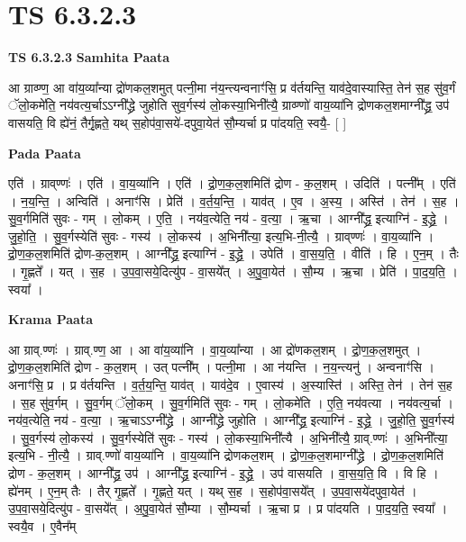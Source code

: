 \documentclass[17pt]{extarticle}
\begin{document}
\section{ TS 6.3.2.3 }

\textbf{TS 6.3.2.3 } \newline
\textbf{Samhita Paata} \newline

आ ग्राव्ण्ण॒ आ वा॑य॒व्या᳚न्या द्रो॑णकल॒शमुत् पत्नी॒मा न॑य॒न्त्यन्वनाꣳ॑सि॒ प्र व॑र्तयन्ति॒ याव॑दे॒वास्यास्ति॒ तेन॑ स॒ह सु॑व॒र्गं ॅलो॒कमे॑ति॒ नय॑वत्य॒र्चाऽऽग्नी᳚द्ध्रे जुहोति सुव॒र्गस्य॑ लो॒कस्या॒भिनी᳚त्यै॒ ग्राव्ण्णो॑ वाय॒व्या॑नि द्रोणकल॒शमाग्नी᳚द्ध्र॒ उप॑ वासयति॒ वि ह्ये॑नं॒ तैर्गृ॒ह्णते॒ यथ् स॒होप॑वा॒सये॑-दपुवा॒येत॑ सौ॒म्यर्चा प्र पा॑दयति॒ स्वयै॒- [  ] \newline

\textbf{Pada Paata} \newline

एति॑ । ग्राव्‌ण्णः॑ । एति॑ । वा॒य॒व्या॑नि । एति॑ । द्रो॒ण॒क॒ल॒शमिति॑ द्रोण - क॒ल॒शम् । उदिति॑ । पत्नी᳚म् । एति॑ । न॒य॒न्ति॒ । अन्विति॑ । अनाꣳ॑सि । प्रेति॑ । व॒र्त॒य॒न्ति॒ । याव॑त् । ए॒व । अ॒स्य॒ । अस्ति॑ । तेन॑ । स॒ह । सु॒व॒र्गमिति॑ सुवः - गम् । लो॒कम् । ए॒ति॒ । नय॑व॒त्येति॒ नय॑ - व॒त्या॒ । ऋ॒चा । आग्नी᳚द्ध्र॒ इत्याग्नि॑ - इ॒द्ध्रे॒ । जु॒हो॒ति॒ । सु॒व॒र्गस्येति॑ सुवः - गस्य॑ । लो॒कस्य॑ । अ॒भिनी᳚त्या॒ इत्य॒भि-नी॒त्यै॒ । ग्राव्‌ण्णः॑ । वा॒य॒व्या॑नि । द्रो॒ण॒क॒ल॒शमिति॑ द्रोण-क॒ल॒शम् । आग्नी᳚द्ध्र॒ इत्याग्नि॑ - इ॒द्ध्रे॒ । उपेति॑ । वा॒स॒य॒ति॒ । वीति॑ । हि । ए॒न॒म् । तैः । गृ॒ह्णते᳚ । यत् । स॒ह । उ॒प॒वा॒सये॒दित्यु॑प - वा॒सये᳚त् । अ॒पु॒वा॒येत॑ । सौ॒म्य । ऋ॒चा । प्रेति॑ । पा॒द॒य॒ति॒ । स्वया᳚ ।  \newline


\textbf{Krama Paata} \newline

आ ग्राव्.ण्णः॑ । ग्राव्.ण्ण॒ आ । आ वा॑य॒व्या॑नि । वा॒य॒व्या᳚न्या । आ द्रो॑णकल॒शम् । द्रो॒ण॒क॒ल॒शमुत् । द्रो॒ण॒क॒ल॒शमिति॑ द्रोण - क॒ल॒शम् । उत् पत्नी᳚म् । पत्नी॒मा । आ न॑यन्ति । न॒य॒न्त्यनु॑ । अन्वनाꣳ॑सि । अनाꣳ॑सि॒ प्र । प्र व॑र्तयन्ति । व॒र्त॒य॒न्ति॒ याव॑त् । याव॑दे॒व । ए॒वास्य॑ । अ॒स्यास्ति॑ । अस्ति॒ तेन॑ । तेन॑ स॒ह । स॒ह सु॑व॒र्गम् । सु॒व॒र्गम् ॅलो॒कम् । सु॒व॒र्गमिति॑ सुवः - गम् । लो॒कमे॑ति । ए॒ति॒ नय॑वत्या । नय॑वत्य॒र्चा । नय॑व॒त्येति॒ नय॑ - व॒त्या॒ । ऋ॒चाऽऽग्नी᳚द्ध्रे । आग्नी᳚द्ध्रे जुहोति । आग्नी᳚द्ध्र॒ इत्याग्नि॑ - इ॒द्ध्रे॒ । जु॒हो॒ति॒ सु॒व॒र्गस्य॑ । सु॒व॒र्गस्य॑ लो॒कस्य॑ । सु॒व॒र्गस्येति॑ सुवः - गस्य॑ । लो॒कस्या॒भिनी᳚त्यै । अ॒भिनी᳚त्यै॒ ग्राव्.ण्णः॑ । अ॒भिनी᳚त्या॒ इत्य॒भि - नी॒त्यै॒ । ग्राव्.ण्णो॑ वाय॒व्या॑नि । वा॒य॒व्या॑नि द्रोणकल॒शम् । द्रो॒ण॒क॒ल॒शमाग्नी᳚द्ध्रे । द्रो॒ण॒क॒ल॒शमिति॑ द्रोण - क॒ल॒शम् । आग्नी᳚द्ध्र॒ उप॑ । आग्नी᳚द्ध्र॒ इत्याग्नि॑ - इ॒द्ध्रे॒ । उप॑ वासयति । वा॒स॒य॒ति॒ वि । वि हि । ह्ये॑नम् । ए॒न॒म् तैः । तैर् गृ॒ह्णते᳚ । गृ॒ह्णते॒ यत् । यथ् स॒ह । स॒होप॑वा॒सये᳚त् । उ॒प॒वा॒सये॑दपुवा॒येत॑ । उ॒प॒वा॒सये॒दित्यु॑प - वा॒सये᳚त् । अ॒पु॒वा॒येत॑ सौ॒म्या । सौ॒म्यर्चा । ऋ॒चा प्र । प्र पा॑दयति । पा॒द॒य॒ति॒ स्वया᳚ । स्वयै॒व । ए॒वैन᳚म् \newline
\end{document}
